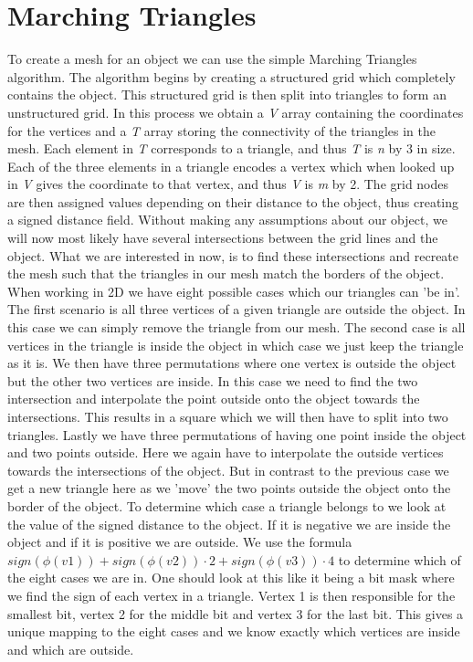 \section{Marching Triangles}
To create a mesh for an object we can use the simple Marching Triangles algorithm. The algorithm begins by creating a structured grid which completely contains the object. This structured grid is then split into triangles to form an unstructured grid. In this process we obtain a \textit{V} array containing the coordinates for the vertices and a \textit{T} array storing the connectivity of the triangles in the mesh. Each element in \textit{T} corresponds to a triangle, and thus \textit{T} is \textit{n} by 3 in size. Each of the three elements in a triangle encodes a vertex which when looked up in \textit{V} gives the coordinate to that vertex, and thus \textit{V} is \textit{m} by 2. The grid nodes are then assigned values depending on their distance to the object, thus creating a signed distance field. Without making any assumptions about our object, we will now most likely have several intersections between the grid lines and the object. What we are interested in now, is to find these intersections and recreate the mesh such that the triangles in our mesh match the borders of the object. When working in 2D we have eight possible cases which our triangles can 'be in'. The first scenario is all three vertices of a given triangle are outside the object. In this case we can simply remove the triangle from our mesh. The second case is all vertices in the triangle is inside the object in which case we just keep the triangle as it is. We then have three permutations where one vertex is outside the object but the other two vertices are inside. In this case we need to find the two intersection and interpolate the point outside onto the object towards the intersections. This results in a square which we will then have to split into two triangles. Lastly we have three permutations of having one point inside the object and two points outside. Here we again have to interpolate the outside vertices towards the intersections of the object. But in contrast to the previous case we get a new triangle here as we 'move' the two points outside the object onto the border of the object. To determine which case a triangle belongs to we look at the value of the signed distance to the object. If it is negative we are inside the object and if it is positive we are outside. We use the formula $sign(\phi(v1)) + sign(\phi(v2))\cdot2 + sign(\phi(v3))\cdot 4$ to determine which of the eight cases we are in. One should look at this like it being a bit mask where we find the sign of each vertex in a triangle. Vertex 1 is then responsible for the smallest bit, vertex 2 for the middle bit and vertex 3 for the last bit. This gives a unique mapping to the eight cases and we know exactly which vertices are inside and which are outside.\\
